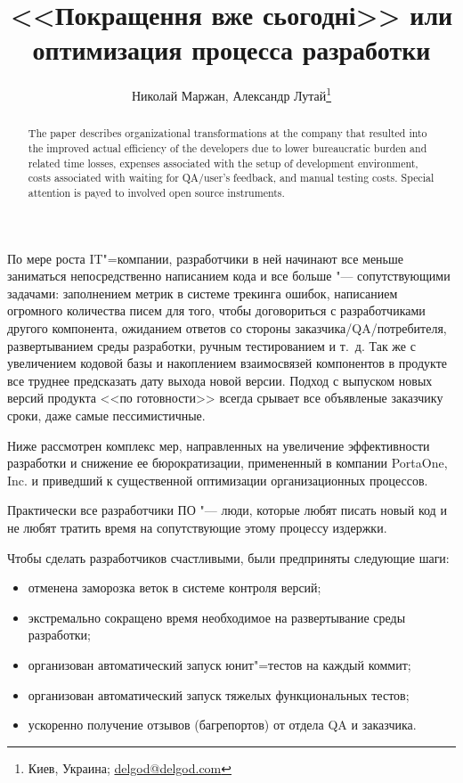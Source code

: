 \documentclass[10pt, a5paper]{article}
\begin{document}
\title{<<Покращення вже сьогодні>> или оптимизация процесса разработки}%

\author{Николай Маржан, Александр Лутай\footnote{Киев, Украина; \url{delgod@delgod.com}}}
\maketitle

\begin{abstract}
The paper describes organizational transformations at the company that resulted into the improved actual efficiency of the developers due to lower bureaucratic burden and related time losses, expenses associated with the setup of development environment, costs associated with waiting for QA/user’s feedback, and manual testing costs. Special attention is payed to involved open source instruments.
\end{abstract}

По мере роста IT"=компании, разработчики в ней начинают все меньше  заниматься непосредственно написанием кода и все больше "--- сопутствующими задачами: заполнением метрик в системе трекинга ошибок, написанием огромного количества писем для того, чтобы договориться с разработчиками другого компонента, ожиданием ответов со стороны заказчика/QA/потребителя, развертыванием среды разработки, ручным тестированием и т.~д. Так же с увеличением кодовой базы и накоплением взаимосвязей компонентов в продукте все труднее предсказать дату выхода новой версии. Подход с выпуском новых версий продукта <<по готовности>> всегда срывает все объявленые заказчику сроки, даже самые пессимистичные.

Ниже рассмотрен комплекс мер, направленных на увеличение эффективности разработки и снижение ее бюрократизации, примененный в компании PortaOne, Inc. и приведший к существенной оптимизации организационных процессов.

Практически все разработчики ПО "--- люди, которые любят писать новый код и не любят тратить время на сопутствующие этому процессу издержки.

Чтобы сделать разработчиков счастливыми, были предприняты следующие шаги:

\begin{itemize}
  \item отменена заморозка веток в системе контроля версий;
  \item экстремально сокращено время необходимое на развертывание среды разработки;
  \item организован автоматический запуск юнит"=тестов на каждый коммит;
  \item организован автоматический запуск тяжелых функциональных тестов;
  \item ускоренно получение отзывов (багрепортов) от отдела QA и заказчика.
\end{itemize}
\end{document}
